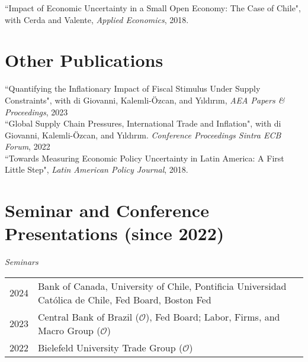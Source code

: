 \documentclass[10pt]{article}
\begin{document}
 \noindent ``Impact of Economic Uncertainty in a Small Open Economy: The Case of Chile", with Cerda and Valente, \emph{Applied Economics}, 2018.

\section*{Other Publications}
   
\noindent ``Quantifying the Inflationary Impact of Fiscal Stimulus Under Supply Constraints", with di Giovanni, Kalemli-\"{O}zcan, and Y{\i}ld{\i}r{\i}m, \emph{AEA Papers \& Proceedings}, 2023\\[-0.125in]
   
\noindent ``Global Supply Chain Pressures, International Trade and Inflation", with di Giovanni, Kalemli-\"{O}zcan, and Y{\i}ld{\i}r{\i}m. {\emph{Conference Proceedings Sintra ECB Forum}, 2022}\\[-0.125in]
   
 \noindent ``Towards Measuring Economic Policy Uncertainty in Latin America: A First Little Step", \emph{Latin American Policy Journal}, 2018. \\[-0.125in]


\section*{Seminar and Conference Presentations (since 2022)}

\noindent 
\emph{Seminars}\\[0.1in]
\begin{tabular}{@{}p{1.8cm}p{13cm}}
2024& Bank of Canada, University of Chile, Pontificia Universidad Cat\'olica de Chile, Fed Board, Boston Fed\\
2023& Central Bank of Brazil ($\mathcal{O}$), Fed Board; Labor, Firms, and Macro Group ($\mathcal{O}$)\\
2022& Bielefeld University Trade Group ($\mathcal{O}$)%
\end{tabular}
\end{document}
